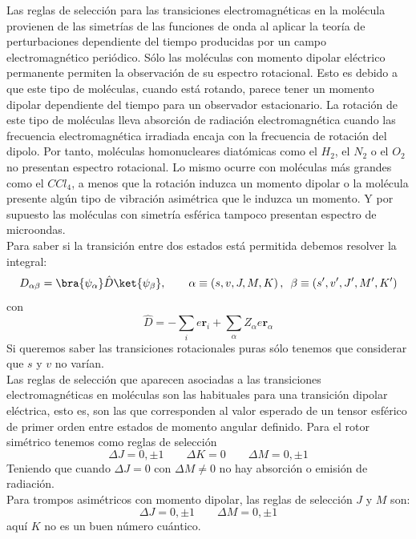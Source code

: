 \documentclass[a4paper]{article}
\begin{document}
Las reglas de selección para las transiciones electromagnéticas en la molécula provienen de las simetrías de las funciones de onda al aplicar la teoría de perturbaciones dependiente del tiempo producidas por un campo electromagnético periódico.
Sólo las moléculas con momento dipolar eléctrico permanente permiten la observación de su espectro rotacional.  Esto es debido a que este tipo de moléculas, cuando está rotando, parece tener un momento dipolar dependiente del tiempo para un observador estacionario. La rotación de este tipo de moléculas lleva absorción de radiación electromagnética cuando las frecuencia electromagnética irradiada encaja con la frecuencia de rotación del dipolo. Por tanto, moléculas homonucleares diatómicas como el $H_2$, el $N_2$ o el $O_2$ no presentan espectro rotacional. Lo mismo ocurre con moléculas más grandes como el $CCl_4$, a menos que la rotación induzca un momento dipolar o la molécula presente algún tipo de vibración asimétrica que le induzca un momento. Y por supuesto las moléculas con simetría esférica tampoco presentan espectro de microondas\cite{haken2013}.\\
 
Para saber si la transición entre dos estados está permitida debemos resolver la integral:
\begin{equation}
D_{\alpha\beta}=\bra{\psi_\alpha}\hat D\ket{\psi_\beta},\qquad \alpha \equiv \left(s,v,J,M,K\right), \,\ \beta \equiv \left(s',v',J',M',K'\right)
\end{equation}
con
\begin{equation}
\hat D = -\sum_i e \boldsymbol r_i + \sum_\alpha Z_\alpha e \boldsymbol r_\alpha
\end{equation}
Si queremos saber las transiciones rotacionales puras sólo tenemos que considerar que $s$ y $v$ no varían.\\

Las reglas de selección que aparecen asociadas a las transiciones electromagnéticas en moléculas son las habituales para una transición dipolar eléctrica, esto es, son las que corresponden al valor esperado de un tensor esférico de primer orden entre estados de momento angular definido.
Para el rotor simétrico tenemos como reglas de selección
\begin{equation}
\Delta J = 0,\pm 1 \qquad\Delta K =0 \qquad \Delta M = 0, \pm 1
\end{equation}
Teniendo que cuando $\Delta J = 0$ con $\Delta M \neq 0$ no hay absorción o emisión de radiación.\\
Para trompos asimétricos con momento dipolar, las reglas de selección $J$ y $M$ son:
\begin{equation}
\Delta J = 0, \pm 1 \qquad\Delta M = 0, \pm 1
\end{equation}
aquí $K$ no es un buen número cuántico. \\
\end{document}
